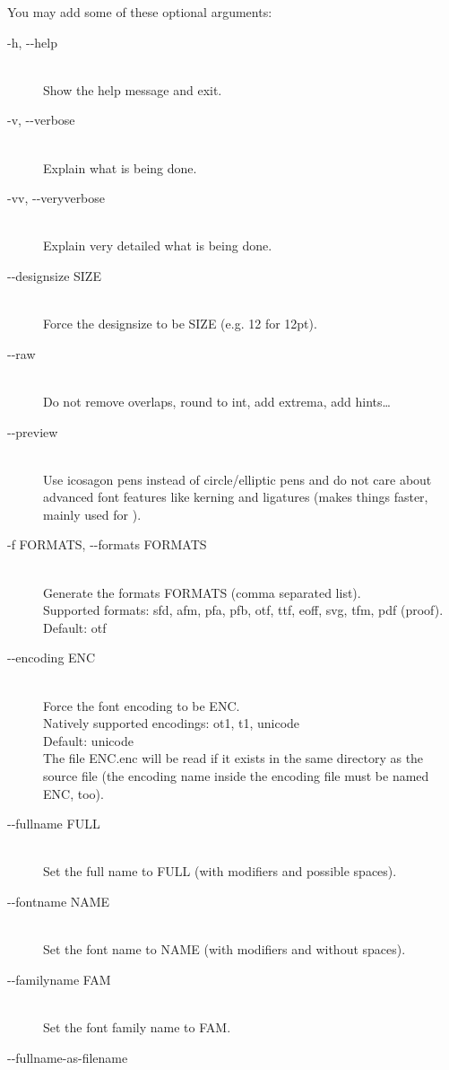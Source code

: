 \documentclass{scrartcl}
\begin{document}
You may add some of these optional arguments:
\begin{description}
	\item[-h, -{}-help] \hfill \\
		Show the help message and exit.
	\item[-v, -{}-verbose ] \hfill \\
		Explain what is being done.
	\item[-vv, -{}-veryverbose] \hfill \\
		Explain very detailed what is being done.
	\item[-{}-designsize SIZE] \hfill \\
		Force the designsize to be SIZE (e.g. 12 for 12pt).
	\item[-{}-raw] \hfill \\
		Do not remove overlaps, round to int, add extrema, add hints\ldots
	\item[-{}-preview  ] \hfill \\
		Use icosagon pens instead of circle/elliptic pens and do not 
		care about advanced font features like kerning and ligatures 
		(makes things faster, mainly used for ).
	\item[-f FORMATS, -{}-formats FORMATS] \hfill \\
		Generate the formats FORMATS (comma separated list).\\
		Supported formats: sfd, afm, pfa, pfb, otf, ttf, eoff, 
		svg, tfm, pdf (proof).\\
		Default: otf
	\item[-{}-encoding ENC ] \hfill \\
		Force the font encoding to be ENC.\\
		Natively supported encodings: ot1, t1, unicode\\
		Default: unicode\\
		The file ENC.enc will be read if it exists in the same directory as the source file (the encoding name inside the encoding file must be named ENC, too).
	\item[-{}-fullname FULL] \hfill \\
		Set the full name to FULL (with modifiers and possible spaces).
	\item[-{}-fontname NAME] \hfill \\
		Set the font name to NAME (with modifiers and without spaces).
	\item[-{}-familyname FAM] \hfill \\
		Set the font family name to FAM.
	\item[-{}-fullname-as-filename] \hfill \\

\end{description}
\end{document}
